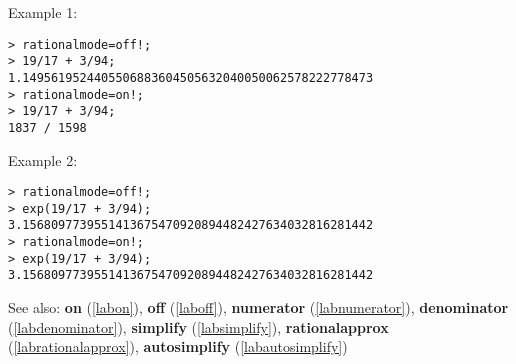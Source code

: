\noindent Example 1: 
\begin{center}\begin{minipage}{15cm}\begin{Verbatim}[frame=single,commandchars=\\\|\~]
> rationalmode=off!;
> 19/17 + 3/94;
1.1495619524405506883604505632040050062578222778473
> rationalmode=on!;
> 19/17 + 3/94;
1837 / 1598
\end{Verbatim}
\end{minipage}\end{center}
\noindent Example 2: 
\begin{center}\begin{minipage}{15cm}\begin{Verbatim}[frame=single,commandchars=\\\|\~]
> rationalmode=off!;
> exp(19/17 + 3/94);
3.1568097739551413675470920894482427634032816281442
> rationalmode=on!;
> exp(19/17 + 3/94);
3.1568097739551413675470920894482427634032816281442
\end{Verbatim}
\end{minipage}\end{center}
See also: \textbf{on} (\ref{labon}), \textbf{off} (\ref{laboff}), \textbf{numerator} (\ref{labnumerator}), \textbf{denominator} (\ref{labdenominator}), \textbf{simplify} (\ref{labsimplify}), \textbf{rationalapprox} (\ref{labrationalapprox}), \textbf{autosimplify} (\ref{labautosimplify})
